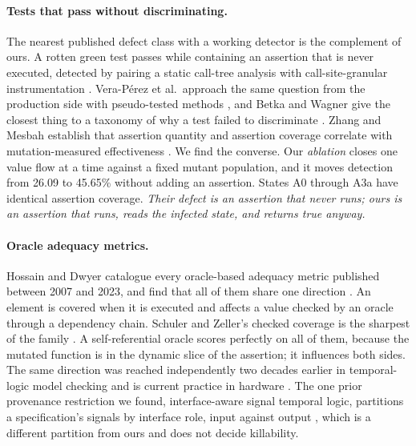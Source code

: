 \documentclass[12pt]{article}
\begin{document}
\paragraph{Tests that pass without discriminating.} The nearest published defect
class with a working detector is the complement of ours. A rotten green test
passes while containing an assertion that is never executed, detected by pairing
a static call-tree analysis with call-site-granular instrumentation
\cite{delplanque2019,aranega2021,googletest3811}. Vera-P\'erez et al.\
approach the same question from the production side with pseudo-tested methods
\cite{veraperez2018}, and Betka and Wagner give the closest thing to a taxonomy
of why a test failed to discriminate \cite{betka2021}. Zhang and Mesbah establish
that assertion quantity and assertion coverage correlate with mutation-measured
effectiveness \cite{zhang2015}. We find the converse. Our \emph{ablation} closes
one value flow at a time against a fixed mutant population, and it moves detection
from 26.09 to 45.65\% without adding an assertion. States A0 through A3a have
identical assertion coverage. \emph{Their defect
is an assertion that never runs; ours is an assertion that runs, reads the
infected state, and returns true anyway.}

\paragraph{Oracle adequacy metrics.} Hossain and Dwyer catalogue every
oracle-based adequacy metric published between 2007 and 2023, and find that all of
them share one direction \cite{hossain2023}. An element is covered when it is
executed and affects a value checked by an oracle through a dependency chain.
Schuler and Zeller's checked coverage is the sharpest of the family
\cite{schuler2011}. A self-referential oracle scores perfectly on all of them,
because the mutated function is in the dynamic slice of the assertion; it
influences both sides. The same direction was reached independently two decades
earlier in temporal-logic model checking \cite{chockler2006fmsd,hoskote1999} and
is current practice in hardware \cite{witharana2022,goldmine-artifact}. The one
prior provenance restriction we found, interface-aware signal temporal logic,
partitions a specification's signals by interface role, input against output
\cite{ferrere2019}, which is a different partition from ours and does not decide
killability.
\end{document}
